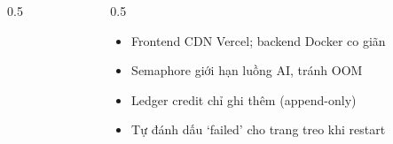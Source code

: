 \documentclass[aspectratio=169,10pt]{beamer}
\begin{document}
\begin{frame}
\begin{columns}[t]
\begin{column}{0.5\textwidth}
\begin{tcolorbox}[creamcard,title={\textcolor{mred}{\rule{1.2mm}{3mm}}\ Bảo mật}]
\begin{itemize}
\end{itemize}
\end{tcolorbox}
\end{column}
\begin{column}{0.5\textwidth}
\begin{tcolorbox}[card,title={\textcolor{mblue}{\rule{1.2mm}{3mm}}\ Vận hành \& Toàn vẹn}]\footnotesize
\begin{itemize}\setlength\itemsep{1mm}
\item Frontend CDN Vercel; backend Docker co giãn
\item Semaphore giới hạn luồng AI, tránh OOM
\item Ledger credit chỉ ghi thêm (append-only)
\item Tự đánh dấu ‘failed’ cho trang treo khi restart
\end{itemize}
\end{tcolorbox}
\end{column}
\end{columns}
\end{frame}
\end{document}
